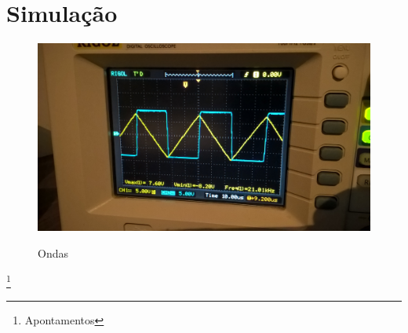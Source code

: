 \documentclass[titlepage, a4paper, 10pt, reqno, openany]{report}
\begin{document}
\section{Simulação}
\begin{figure}[H]
	\centering
	\includegraphics[scale=0.13]{./image/Ondas.jpg}\\
	\caption{Ondas}
\end{figure}
\newpage
\newpage
\footnote{Apontamentos}
%
	
\end{document}
